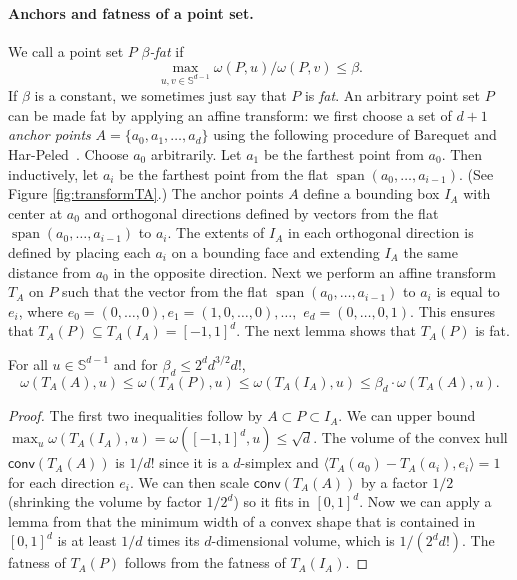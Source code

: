 \documentclass[11pt]{myclass}
\renewcommand{\b}[1]{\ensuremath{\mathbb{#1}}}
\newcommand{\IP}[2]{\ensuremath{ \langle #1 , #2 \rangle}}
\newcommand{\wid}{\omega}
\def\span{\mathop{\mathrm{span}}}
\begin{document}
\paragraph{Anchors and fatness of a point set.}
We call a point set $P$ \emph{$\beta$-fat} if 
$$
\max_{u,v \in \b{S}^{d-1}} \wid(P,u)/\wid(P,v) \leq \beta.
$$
If $\beta$ is a constant, we sometimes just say that $P$ is \emph{fat}.  
An arbitrary point set $P$ can be made fat by applying an affine 
transform: we first choose a set of $d+1$ \emph{anchor points} 
$A = \{a_0, a_1, \ldots, a_d\}$ using the following procedure of 
Barequet and Har-Peled~\cite{BH01}.  Choose $a_0$ arbitrarily.  
Let $a_1$ be the farthest point from $a_0$.  Then inductively, 
let $a_i$ be the farthest point from the flat 
$\span (a_0, \ldots, a_{i-1})$.  (See Figure \ref{fig:transformTA}.)
The anchor points $A$ define a bounding box $I_A$ with center at $a_0$ 
and orthogonal directions defined by vectors from the flat 
$\span(a_0, \ldots, a_{i-1})$ to $a_i$.  The extents of $I_A$ in each 
orthogonal direction is defined by placing each $a_i$ on a bounding 
face and extending $I_A$ the same distance from $a_0$ in the 
opposite direction.  
Next we perform an affine transform $T_A$ on $P$ such that the vector from the flat $\span(a_0, \ldots, a_{i-1})$ to $a_i$ is equal to $e_i$, where $e_0 = (0,\ldots,0), e_1 = (1,0,\ldots,0), \ldots,$ $e_d = (0, \ldots, 0,1)$.  
This ensures that $T_A(P) \subseteq T_A(I_A)  = [-1,1]^d$.  The next
lemma shows that $T_A(P)$ is fat.

\begin{lemma}
\label{lemma:fat}
For all $u \in \b{S}^{d-1}$ and for $\beta_d \leq 2^d d^{3/2}  d!$,
\begin{equation}
\wid(T_A(A),u) \leq \wid(T_A(P),u) \leq \wid(T_A(I_A), u) \leq \beta_d \cdot \wid(T_A(A),u).
\label{eq:fat}
\end{equation}
\end{lemma}

\begin{proof}
The first two inequalities follow by $A \subset P \subset I_A$.  We can upper bound $\max_u \wid(T_A(I_A),u) = \wid([-1,1]^d,u) \leq \sqrt{d}$.
The volume of the convex hull $\textsf{conv}(T_A(A))$ is $1/d!$ since it is a $d$-simplex and $\IP{T_A(a_0)-T_A(a_i)}{e_i} = 1$ for each direction $e_i$.  
We can then scale $\textsf{conv}(T_A(A))$ by a factor $1/2$ (shrinking the volume by factor $1/2^d$) so it fits in $[0,1]^d$.  Now we can apply a lemma from \cite{HPbook} that the minimum width of a convex shape that is contained in $[0,1]^d$ is at least $1/d$ times its $d$-dimensional volume, which is $1/(2^d d!)$.  
The fatness of $T_A(P)$ follows from the fatness of $T_A(I_A)$.
\end{proof}
\end{document}
